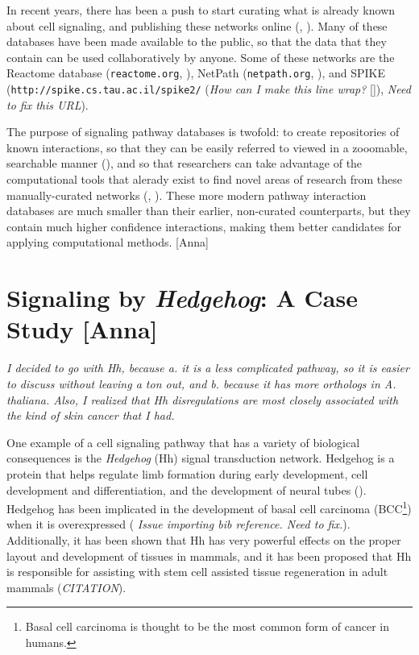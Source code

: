 \documentclass[12pt,twoside]{reedthesis}
\newcommand{\new}[2]{{\color{orange}#1 [#2]}}
\theoremstyle{definition}
\begin{document}
In recent years, there has been a push to start curating what is already known about cell signaling, and publishing these networks online (\cite{Bauer-Mehren2009}, \cite{Cusick2009}). Many of these databases have been made available to the public, so that the data that they contain can be used collaboratively by anyone. Some of these networks are the Reactome database (\texttt{reactome.org}, \cite{Matthews2009}), NetPath (\texttt{netpath.org}, \cite{Kandasamy2010}), and SPIKE (\texttt{http://spike.cs.tau.ac.il/spike2/} (\new{\emph{How can I make this line wrap?}}{}), \cite{Paz2011} \emph{Need to fix this URL}).\par
The purpose of signaling pathway databases is twofold: to create repositories of known interactions, so that they can be easily referred to viewed in a zooomable, searchable manner (\cite{Hu2007}), and so that researchers can take advantage of the computational tools that alerady exist to find novel areas of research from these manually-curated networks (\cite{Karlebach2008}, \cite{Battle2010}). \new{These more modern pathway interaction databases are much smaller than their earlier, non-curated counterparts, but they contain much higher confidence interactions, making them better candidates for applying computational methods.}{Anna}\par

\section{Signaling by \emph{Hedgehog}\new{: A Case Study}{Anna}}
\emph{I decided to go with Hh, because a. it is a less complicated pathway, so it is easier to discuss without leaving a ton out, and b. because it has more orthologs in A. thaliana. Also, I realized that Hh disregulations are most closely associated with the kind of skin cancer that I had.}\par

One example of a cell signaling pathway that has a variety of biological consequences is the \textit{Hedgehog} (Hh) signal transduction network. Hedgehog is a protein that helps regulate limb formation during early development, cell development and differentiation, and the development of neural tubes (\cite{Hui2011}). Hedgehog has been implicated in the development of basal cell carcinoma (BCC\footnote{Basal cell carcinoma is thought to be the most common form of cancer in humans\cite{paper}.}) when it is overexpressed (\cite{Beachy2004} \emph{Issue importing bib reference. Need to fix.}). Additionally, it has been shown that Hh has very powerful effects on the proper layout and development of tissues in mammals, and it has been proposed that Hh is responsible for assisting with stem cell assisted tissue regeneration in adult mammals (\emph{CITATION}).
\end{document}
